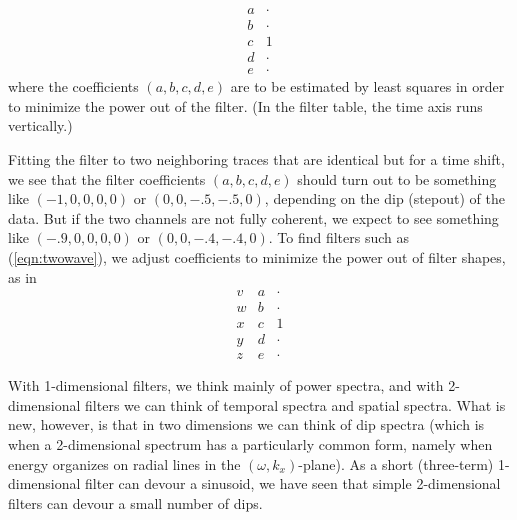 \begin{equation}
   \begin{array}{cc}
        a & \cdot  \\
        b & \cdot  \\
        c &   1    \\
        d & \cdot  \\
        e & \cdot
        \end{array}
\label{eqn:onedip}
\end{equation}
where the coefficients
$(a,b,c,d,e)$
are to be estimated by least squares in order
to minimize the power out of the filter.
(In the filter table,
the time axis runs vertically.)
\par
Fitting the filter to two neighboring traces
that are identical but for a time shift, we see that
the filter coefficients $(a,b,c,d,e)$ should turn out to be
something like $(-1,0,0,0,0)$ or
$(0,0,-.5,-.5, 0)$,
depending on the dip (stepout) of the data.
But if the two channels are not fully coherent, we expect to see
something like
$(-.9,0,0,0,0)$ or
$(0,0,-.4,-.4,0)$.
To find filters such as (\ref{eqn:twowave}),
we adjust coefficients to minimize the power out
of filter shapes, as in
\begin{equation}
        \begin{array}{ccccc}
                v  & a & \cdot \\
                w  & b & \cdot \\
                x  & c &   1    \\
                y  & d & \cdot \\
                z  & e & \cdot 
        \end{array}
\end{equation}
\par
With 1-dimensional filters,
we think mainly of power spectra,
and with 2-dimensional filters
we can think of temporal spectra and spatial spectra.
What is new, however,
is that in two dimensions we can think of dip spectra
(which is when a 2-dimensional spectrum has a particularly common form,
namely when energy organizes on radial lines in the $(\omega,k_x)$-plane).
As a short (three-term) 1-dimensional filter can devour a sinusoid,
we have seen that simple 2-dimensional filters can devour
a small number of dips.

